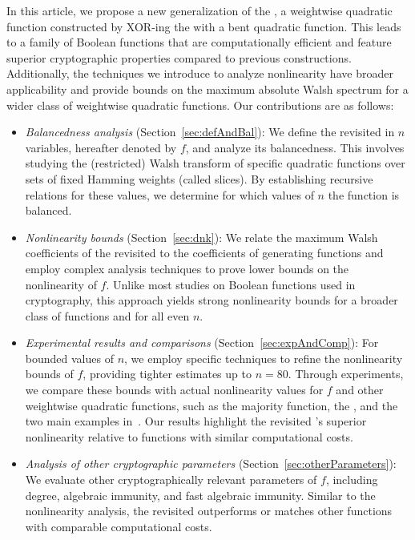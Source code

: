 \documentclass[11pt]{llncs}
\begin{document}
\bigskip
In this article, we propose a new generalization of the \hwbf{}, a weightwise quadratic function constructed by \textsf{XOR}-ing the \hwbf{} with a bent quadratic function. This leads to a family of Boolean functions that are computationally efficient and feature superior cryptographic properties compared to previous constructions. 
Additionally, the techniques we introduce to analyze nonlinearity have broader applicability and provide bounds on the maximum absolute Walsh spectrum for a wider class of weightwise quadratic functions. Our contributions are as follows:
\begin{itemize}
	\item\emph{Balancedness analysis} (Section~\ref{sec:defAndBal}): We define the revisited \hwbf{} in $n$ variables, hereafter denoted by $f$, and analyze its balancedness. This involves studying the (restricted) Walsh transform of specific quadratic functions over sets of fixed Hamming weights (called slices). By establishing recursive relations for these values, we determine for which values of $n$ the function is balanced.

    \item \emph{Nonlinearity bounds} (Section~\ref{sec:dnk}):
    We relate the maximum Walsh coefficients of the revisited \hwbf{} to the coefficients of generating functions and employ complex analysis techniques to prove lower bounds on the nonlinearity of $f$. 
    Unlike most studies on Boolean functions used in cryptography, this approach yields strong nonlinearity bounds for a broader class of functions and for all even $n$.
    
    \item \emph{Experimental results and comparisons} (Section~\ref{sec:expAndComp}): 
    For bounded values of $n$, we employ specific techniques to refine the nonlinearity bounds of $f$, providing tighter estimates up to $n = 80$. Through experiments, we compare these bounds with actual nonlinearity values for $f$ and other weightwise quadratic functions, such as the majority function, the \hwbf{}, and the two main examples in~\cite{DAM:MeaOza24}. 
    Our results highlight the revisited \hwbf{}'s superior nonlinearity relative to functions with similar computational costs.
    
    \item \emph{Analysis of other cryptographic parameters} (Section~\ref{sec:otherParameters}):  
    We evaluate other cryptographically relevant parameters of $f$, including degree, algebraic immunity, and fast algebraic immunity. Similar to the nonlinearity analysis, the revisited \hwbf{} outperforms or matches other functions with comparable computational costs.
\end{itemize}
\end{document}
